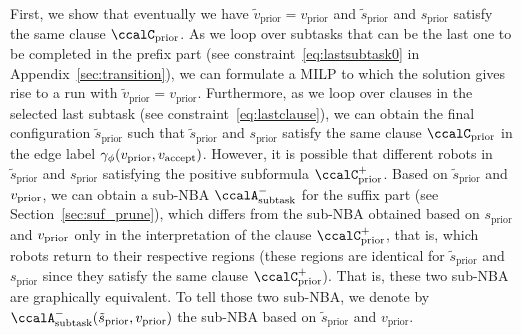 \documentclass[Afour,sageh,times]{sagej}
\newcommand{\auto}[1]{\ccalA_{\textup{#1}}}
\newcommand{\vertex}[1]{v_{\textup{#1}}}
\begin{document}
{{First, we show that eventually we have $\tilde{v}_{\text{prior}} = {v}_{\text{prior}}$ and $\tilde{s}_{\text{prior}}$ and ${s}_{\text{prior}}$ satisfy the same clause $\ccalC_{\text{prior}}$. As we loop over subtasks that can be the last one to be completed in the prefix part (see constraint~\eqref{eq:lastsubtask0} in Appendix~\ref{sec:transition}), we can formulate a MILP to which the solution gives rise to a run with $\tilde{v}_{\text{prior}} = {v}_{\text{prior}}$. Furthermore, as we loop over clauses in the selected last subtask (see constraint~\eqref{eq:lastclause}), we can obtain the final configuration $\tilde{s}_{\text{prior}}$ such that $\tilde{s}_{\text{prior}}$ and ${s}_{\text{prior}}$ satisfy the same clause $\ccalC_{\text{prior}}$ in the edge label $\gamma_\phi(\vertex{prior}, \vertex{accept})$. However, it is possible that different robots in $\tilde{s}_{\text{prior}}$ and $s_{\text{prior}}$ satisfying the positive subformula $\ccalC_\text{prior}^+$. Based on $\tilde{s}_{\text{prior}}$ and $\vertex{prior}$, we can obtain a sub-NBA $\auto{subtask}^-$ for the suffix part (see Section~\ref{sec:suf_prune}), which  differs from the sub-NBA obtained based on  $s_{\text{prior}}$ and $\vertex{prior}$ only in the interpretation of the  clause $\ccalC_\text{prior}^+$, that is, which robots return to their respective regions (these regions are identical for $\tilde{s}_{\text{prior}}$ and $s_{\text{prior}}$ since they satisfy the same clause $\ccalC_{\text{prior}}^+$). That is, these two sub-NBA are graphically equivalent. To tell those two sub-NBA, we denote by $\auto{subtask}^-( \tilde{s}_{\text{prior}},  {v}_{\text{prior}})$ the sub-NBA based on $\tilde{s}_{\text{prior}} $ and $  {v}_{\text{prior}}$.

}}
\end{document}
